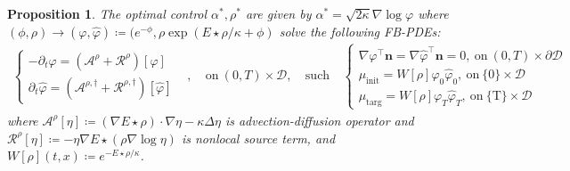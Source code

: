 \documentclass[10pt,a4paper]{article}
\newtheorem{proposition}{Proposition}
\begin{document}
\vspace{0.4cm}
\begin{proposition} \cite{Backhoff2020MeanFieldErgodic}
The optimal control $\displaystyle \alpha ^{*} ,\rho ^{*}$ are given by $\displaystyle \alpha ^{*} =\sqrt{2\kappa } \nabla \log \varphi $ where $\displaystyle ( \phi ,\rho )\rightarrow ( \varphi ,\hat{\varphi }) \coloneq ( e^{-\phi } ,\rho \exp( E\star \rho /\kappa +\phi )$ solve the following FB-PDEs:
\begin{equation}
\begin{aligned}
\begin{cases}
-\partial _{t} \varphi =\left(\mathcal{A}^{\rho } +\mathcal{R}^{\rho }\right)[ \varphi ] & \\
\partial _{t}\hat{\varphi } =\left(\mathcal{A}^{\rho ,\dagger } +\mathcal{R}^{\rho ,\dagger }\right)[\hat{\varphi }] & 
\end{cases} ,\  & \text{on} \ {\displaystyle (0,T)\times \mathcal{D} ,} \  & \text{such that} \  & \begin{cases}
\nabla \varphi ^{\top }\mathbf{n} =\nabla \hat{\varphi }^{\top }\mathbf{n} =0,\ \text{on} \ ( 0,T) \times \partial \mathcal{D}\\
\mu _{\text{init}} =W[ \rho ] \varphi _{0}\hat{\varphi }_{0} ,\ \text{on} \ \{0\} \times \mathcal{D}\\
\mu _{\text{targ}} =W[ \rho ] \varphi _{T}\hat{\varphi }_{T} ,\ \text{on} \ \text{\{T\}} \times \mathcal{D}
\end{cases} & 
\end{aligned}
\end{equation}
where $\displaystyle \mathcal{A}^{\rho }[ \eta ] \coloneq ( \nabla E\star \rho ) \cdot \nabla \eta -\kappa \Delta \eta $ is advection-diffusion operator and $\displaystyle {\textstyle \mathcal{R}^{\rho }[ \eta ] \coloneq -\eta \nabla E\star ( \rho \nabla \log \eta )}$ is nonlocal source term, and $\displaystyle W[ \rho ]( t,x) \coloneq e^{-E\star \rho /\kappa }$.
\end{proposition}
\end{document}

